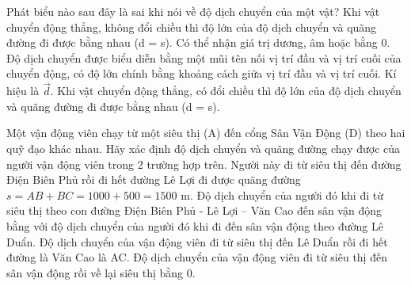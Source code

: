 





\begin{ex}
Phát biểu nào sau đây là sai khi nói về độ dịch chuyển của một vật?
\choice
{Khi vật chuyển động thẳng, không đổi chiều thì độ lớn của độ dịch chuyển và quãng đường đi được bằng nhau (d = s).}
{Có thể nhận giá trị dương, âm hoặc bằng 0.}
{Độ dịch chuyển được biểu diễn bằng một mũi tên nối vị trí đầu và vị trí cuối của chuyển động, có độ lớn chính bằng khoảng cách giữa vị trí đầu và vị trí cuối. Kí hiệu là $\vec{d}$.}
{\True Khi vật chuyển động thẳng, có đổi chiều thì độ lớn của độ dịch chuyển và quãng đường đi được bằng nhau (d = s).}
\end{ex}



\begin{ex}
Một vận động viên chạy từ một siêu thị (A) đến cổng Sân Vận Động (D) theo hai quỹ đạo khác nhau. Hãy xác định độ dịch chuyển và quãng đường chạy được của người vận động viên trong 2 trường hợp trên.
\choiceTF
{\True Người này đi từ siêu thị đến đường Điện Biên Phủ rồi đi hết đường Lê Lợi đi được quãng đường $s = AB + BC = 1000 + 500 = 1500$ m.}
{\True Độ dịch chuyển của người đó khi đi từ siêu thị theo con đường Điện Biên Phủ - Lê Lợi – Văn Cao đến sân vận động bằng với độ dịch chuyển của người đó khi đi đến sân vận động theo đường Lê Duẩn.}
{\True Độ dịch chuyển của vận động viên đi từ siêu thị đến Lê Duẩn rồi đi hết đường là Văn Cao là AC.}
{\True Độ dịch chuyển của vận động viên đi từ siêu thị đến sân vận động rồi về lại siêu thị bằng 0.}
\end{ex}

